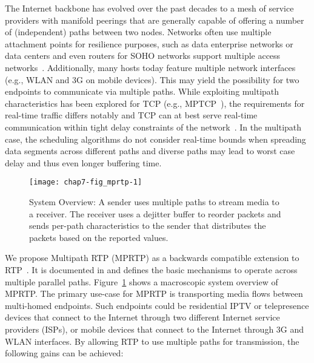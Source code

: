 The Internet backbone has evolved over the past decades to a mesh of service
providers with manifold peerings that are generally capable of offering a
number of (independent) paths between two nodes. Networks often use multiple
attachment points for resilience purposes, such as data enterprise networks or
data centers and even routers for SOHO networks support multiple access
networks~\cite{draft.fun.multi, draft.homenet.arch}. Additionally, many hosts
today feature multiple network interfaces (e.g., WLAN and 3G on mobile
devices). This may yield the possibility for two endpoints to communicate via
multiple paths. While exploiting multipath characteristics
\cite{Wischik:2008:RPP} has been explored for TCP (e.g.,
MPTCP~\cite{rfc6824}), the requirements for real-time traffic differs notably
and TCP can at best serve real-time communication within tight delay
constraints of the network~\cite{Brosh:tcp-real-time}. In the multipath case,
the scheduling algorithms do not consider real-time bounds when spreading data
segments across different paths and diverse paths may lead to worst case delay
and thus even longer buffering time.

\begin{figure}
\centerline {
\texttt{[image: chap7-fig\_mprtp-1]}
}
\caption{System Overview: A sender uses multiple paths to stream media
  to a receiver.  The receiver uses a dejitter buffer to reorder
  packets and sends per-path characteristics to the sender that
  distributes the packets based on the reported values.}
\label{chap7:fig_mprtp}
\end{figure}

We propose Multipath RTP (MPRTP) as a backwards compatible extension to
RTP~\cite{rfc3550}. It is documented in \cite{draft.mprtp} and defines the
basic mechanisms to operate across multiple parallel paths.
Figure~\ref{chap7:fig_mprtp} shows a macroscopic system overview of MPRTP. The
primary use-case for MPRTP is transporting media flows between multi-homed
endpoints. Such endpoints could be residential IPTV or telepresence devices
that connect to the Internet through two different Internet service providers
(ISPs), or mobile devices that connect to the Internet through 3G and WLAN
interfaces. By allowing RTP to use multiple paths for transmission, the
following gains can be achieved:

